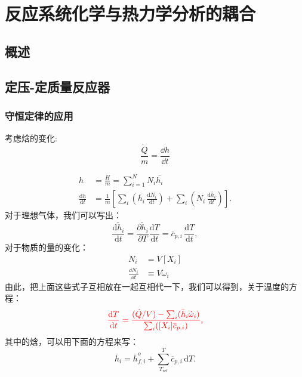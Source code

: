 
\section{反应系统化学与热力学分析的耦合}
\subsection{概述}
\subsection{定压-定质量反应器}
\subsubsection{守恒定律的应用}

考虑焓的变化:
\begin{equation}
    \frac{\dot{Q}}{m} = \frac{\dd h}{\dd t}
\end{equation}

\[
    \begin{aligned}
        h&={\frac{H}{m}}=\sum_{i=1}^{N}N_{i}{\overline{{h_{i}}}}{}\\
        {\frac{\mathrm{d}h}{\mathrm{d}t}}&={\frac{1}{m}}\left[\sum_{i}\left({\overline{{h}}}_{i}\,{\frac{\mathrm{d}N_{i}}{\mathrm{d}t}}\right)+\sum_{i}\left(N_{i}\,{\frac{\mathrm{d}{\overline{{h}}}_{i}}{\mathrm{d}t}}\right)\right].
    \end{aligned}
\]
对于理想气体，我们可以写出：
\[
    {\frac{\mathrm{d}{\tilde{h}}_{i}}{\mathrm{d}t}}={\frac{\partial{\tilde{h}}_{i}}{\partial T}}{\frac{\mathrm{d}T}{\mathrm{d}t}}={\overline{{c}}}_{p,i}\,{\frac{\mathrm{d}T}{\mathrm{d}t}},
\]
对于物质的量的变化：
\[
    \begin{aligned}
        N_i &= V[X_i]\\
        \frac{\dd N_i}{\dd t} &\equiv V\dot{\omega}_i
    \end{aligned}\]
由此，把上面这些式子互相放在一起互相代一下，我们可以得到，关于温度的方程：
\begin{equation}\color{red}\label{equ:reac_p_T}
    {\frac{\mathrm{d}T}{\mathrm{d}t}}={\frac{({\dot{Q}}/V)-\sum_{i}({\bar{h}}_{i}{\dot{\omega}}_{i})}{\sum_{i}([X_{i}]{\overline{{c}}}_{p,i})}},
\end{equation}其中的焓，可以用下面的方程来写：
\begin{equation}
    \overline{{{h}}}_{i}=\overline{{{h}}}_{f,i}^{o}+\sum_{T_\mathrm{ref}}^{T}\overline{{{c}}}_{p,i}\,\mathrm{d}T.
\end{equation}

